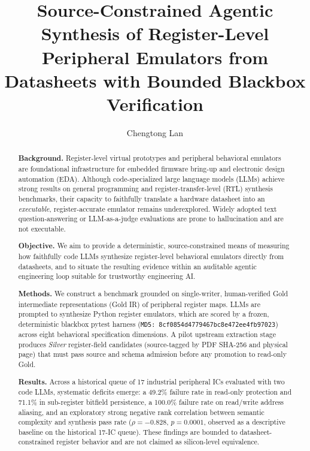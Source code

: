 \documentclass[preprint,review]{elsarticle}
\theoremstyle{definition}
\begin{document}
\title{Source-Constrained Agentic Synthesis of Register-Level Peripheral
Emulators from Datasheets with Bounded Blackbox Verification}

\author[a]{Chengtong Lan}

\begin{abstract}

\textbf{Background.} Register-level virtual prototypes and peripheral behavioral
emulators are foundational infrastructure for embedded firmware bring-up and
electronic design automation (EDA). Although code-specialized large language
models (LLMs) achieve strong results on general programming and register-transfer-level
(RTL) synthesis benchmarks, their capacity to faithfully translate a hardware
datasheet into an \emph{executable}, register-accurate emulator remains underexplored.
Widely adopted text question-answering or LLM-as-a-judge evaluations are prone to
hallucination and are not executable.

\textbf{Objective.} We aim to provide a deterministic, source-constrained means of
measuring how faithfully code LLMs synthesize register-level behavioral emulators
directly from datasheets, and to situate the resulting evidence within an auditable
agentic engineering loop suitable for trustworthy engineering AI.

\textbf{Methods.} We construct a benchmark grounded on single-writer, human-verified
Gold intermediate representations (Gold IR) of peripheral register maps. LLMs are
prompted to synthesize Python register emulators, which are scored by a frozen,
deterministic blackbox pytest harness (\texttt{MD5: 8cf0854d4779467bc8e472ee4fb97023})
across eight behavioral specification dimensions. A pilot upstream extraction stage
produces \emph{Silver} register-field candidates (source-tagged by PDF SHA-256 and
physical page) that must pass source and schema admission before any promotion to read-only Gold.

\textbf{Results.} Across a historical queue of 17 industrial peripheral ICs evaluated
with two code LLMs, systematic deficits emerge: a 49.2\% failure rate in read-only
protection and 71.1\% in sub-register bitfield persistence, a 100.0\% failure rate on
read/write address aliasing, and an exploratory strong negative rank correlation between semantic
complexity and synthesis pass rate ($\rho=-0.828$, $p=0.0001$, observed as a descriptive baseline on the historical 17-IC queue). These findings are bounded to
datasheet-constrained register behavior and are not claimed as silicon-level equivalence.


\end{abstract}
\end{document}
